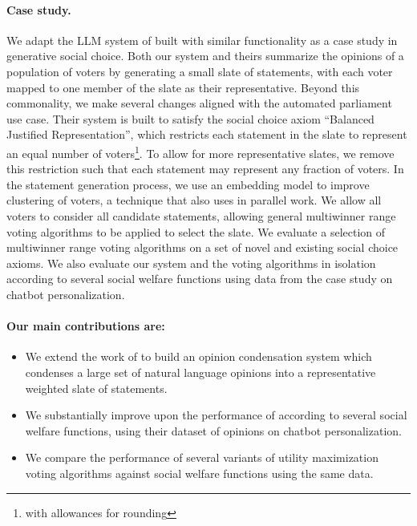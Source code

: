 \documentclass[11pt]{article}
\begin{document}
\paragraph{Case study.}
We adapt the LLM system of \citet{fish-v2} built with similar functionality as a case study in generative social choice. Both our system and theirs summarize the opinions of a population of voters by generating a small slate of statements, with each voter mapped to one member of the slate as their representative. Beyond this commonality, we make several changes aligned with the automated parliament use case. Their system is built to satisfy the social choice axiom ``Balanced Justified Representation'', which restricts each statement in the slate to represent an equal number of voters\footnote{with allowances for rounding}. To allow for more representative slates, we remove this restriction such that each statement may represent any fraction of voters. In the statement generation process, we use an embedding model to improve clustering of voters, a technique that \citet{gsc-next-gen} also uses in parallel work. We allow all voters to consider all candidate statements, allowing general multiwinner range voting algorithms to be applied to select the slate. We evaluate a selection of multiwinner range voting algorithms on a set of novel and existing social choice axioms. We also evaluate our system and the voting algorithms in isolation according to several social welfare functions using data from the \citet{fish-v2} case study on chatbot personalization.

\paragraph{Our main contributions are:}
\begin{itemize}
    \item We extend the work of \citet{fish-v2} to build an opinion condensation system which condenses a large set of natural language opinions into a representative weighted slate of statements.
    \item We substantially improve upon the performance of \citet{fish-v2} according to several social welfare functions, using their dataset of opinions on chatbot personalization.
    \item We compare the performance of several variants of utility maximization voting algorithms against social welfare functions using the same data.
\end{itemize}
\end{document}
